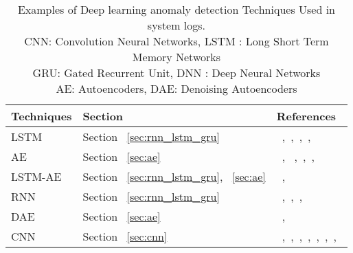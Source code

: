 \begin{table*}
\begin{center}
\caption{Examples of Deep learning anomaly detection Techniques Used in system logs.
        \\CNN: Convolution Neural Networks, LSTM : Long Short Term Memory Networks
        \\GRU: Gated Recurrent Unit, DNN : Deep Neural Networks
        \\AE: Autoencoders, DAE: Denoising Autoencoders}
  \label{tab:logAnomalyDetect}
    \begin{tabular}{ | l | p{2cm} | p{6cm} |}
    \hline
     \textbf{Techniques}  & \textbf{Section} & \textbf{References} \\ \hline
     LSTM & Section ~\ref{sec:rnn_lstm_gru} & ~\cite{hochreiter1997long},~\cite{brown2018recurrent},~\cite{tuor2017deep},~\cite{das2018desh},~\cite{malhotra2015long} \\\hline
     AE & Section ~\ref{sec:ae} & ~\cite{du2017deeplog},~\cite{andrews2016detecting} ,~\cite{sakurada2014anomaly},~\cite{nolle2018analyzing},~\cite{nolle2016unsupervised}\\\hline
     LSTM-AE & Section ~\ref{sec:rnn_lstm_gru}, ~\ref{sec:ae} & ~\cite{grover2018anomaly},~\cite{wolpher2018anomaly} \\\hline
     RNN & Section ~\ref{sec:rnn_lstm_gru} & ~\cite{brown2018recurrent},~\cite{zhang2018role},~\cite{nanduri2016anomaly},~\cite{fengming2017anomaly}\\\hline
     DAE & Section ~\ref{sec:ae} & ~\cite{marchi2015non},~\cite{nolle2016unsupervised}\\\hline
     CNN & Section ~\ref{sec:cnn} & ~\cite{lu2018detecting},~\cite{yuan2018insider},~\cite{racki2018compact},~\cite{zhou2016spatial},~\cite{gorokhov2017convolutional},~\cite{liao2017deep},~\cite{cheng2017deep},~\cite{zhang2018alphamex}\\\hline
    \end{tabular}
\end{center}
\end{table*}










